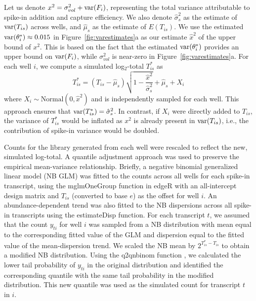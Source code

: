 \documentclass{article}
\begin{document}

Let us denote $x^2 = \sigma^2_{vol} + \mbox{var}(F_i)$, representing the total variance attributable to spike-in addition and capture efficiency.
We also denote $\hat\sigma^2_s$ as the estimate of $\mbox{var}(T_{is})$ across wells, and $\hat\mu_s$ as the estimate of $E(T_{is})$.
We use the estimated $\mbox{var}(\theta^*_i) \approx 0.015$ in Figure~\ref{fig:varestimates}a as our estimate $\hat{x}^2$ of the upper bound of $x^2$.
This is based on the fact that the estimated $\mbox{var}(\theta^*_i)$ provides an upper bound on $\mbox{var}(F_i)$, while $\sigma^2_{vol}$ is near-zero in Figure~\ref{fig:varestimates}a.
For each well $i$, we compute a simulated log$_2$-total $T^*_{is}$ as
\[
    T^*_{is} = (T_{is} - \hat\mu_s)\sqrt{1-\frac{ \hat{x}^2}{\hat\sigma^2_s}} + \hat\mu_s + X_i
\]
where $X_i \sim \mbox{Normal}(0, \hat{x}^2)$ and is independently sampled for each well.
This approach ensures that $\mbox{var}(T^*_{is}) = \hat\sigma^2_s$.
In contrast, if $X_i$ were directly added to $T_{is}$, the variance of $T^*_{is}$ would be inflated as $x^2$ is already present in $\mbox{var}(T_{is})$, i.e., the contribution of spike-in variance would be doubled.

Counts for the library generated from each well were rescaled to reflect the new, simulated log-total.
A quantile adjustment approach was used to preserve the empirical mean-variance relationship.
Briefly, a negative binomial generalized linear model (NB GLM) was fitted to the counts across all wells for each spike-in transcript, using the mglmOneGroup function in edgeR \cite{mccarthy2012differential, robinson2010edgeR} with an all-intercept design matrix and $T_{is}$ (converted to base $e$) as the offset for well $i$.
An abundance-dependent trend was also fitted to the NB dispersions across all spike-in transcripts using the estimateDisp function.
For each transcript $t$, we assumed that the count $y_{ti}$ for well $i$ was sampled from a NB distribution with mean equal to the corresponding fitted value of the GLM and dispersion equal to the fitted value of the mean-dispersion trend.
We scaled the NB mean by $2^{T^*_{is} - T_{is}}$ to obtain a modified NB distribution.
Using the q2qnbinom function \cite{robinson2008small}, we calculated the lower tail probability of $y_{ti}$ in the original distribution and identified the corresponding quantile with the same tail probability in the modified distribution.
This new quantile was used as the simulated count for transcript $t$ in $i$.
\end{document}
